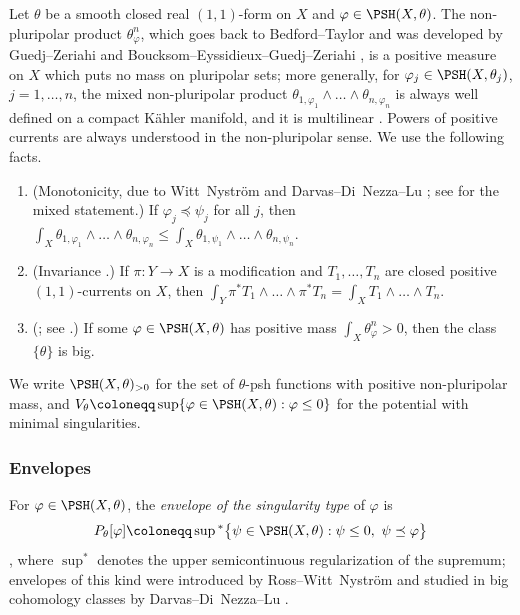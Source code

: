 Let $\theta$ be a smooth closed real $(1,1)$-form on $X$ and
$\varphi\in\PSH(X,\theta)$. The non-pluripolar product
$\theta_\varphi^n$, which goes back to Bedford--Taylor \cite{BT87} and
was developed by Guedj--Zeriahi \cite{GZ07} and
Boucksom--Eyssidieux--Guedj--Zeriahi
\cite{BEGZ10}, is a positive measure on $X$ which puts no mass on
pluripolar sets; more generally, for $\varphi_j\in\PSH(X,\theta_j)$,
$j=1,\dots,n$, the mixed non-pluripolar product
$\theta_{1,\varphi_1}\wedge\dots\wedge\theta_{n,\varphi_n}$ is always
well defined on a compact K\"ahler manifold, and it is multilinear
\cite[Proposition~2.2.1]{SGPT}. Powers of positive currents are always
understood in the non-pluripolar sense. We use the following facts.
\begin{enumerate}[label=(\alph*),leftmargin=*,itemsep=.2em,topsep=.3em]
\item\label{nk:it:monotone} (Monotonicity, due to Witt~Nystr\"om \cite{WN19}
  and Darvas--Di~Nezza--Lu \cite{DDNL18mono}; see
  \cite[Theorem~2.4.3]{SGPT} for the mixed statement.) If
  $\varphi_j\preceq\psi_j$ for all $j$, then
  $\int_X\theta_{1,\varphi_1}\wedge\dots\wedge\theta_{n,\varphi_n}
  \le\int_X\theta_{1,\psi_1}\wedge\dots\wedge\theta_{n,\psi_n}$.
\item\label{nk:it:invariance} (Invariance \cite[Proposition~2.4.2]{SGPT}.)
  If $\pi\colon Y\to X$ is a modification and $T_1,\dots,T_n$ are
  closed positive $(1,1)$-currents on $X$, then
  $\int_Y\pi^*T_1\wedge\dots\wedge\pi^*T_n=\int_XT_1\wedge\dots\wedge T_n$.
\item\label{nk:it:bigness} (\cite[Proposition~1.22]{BEGZ10}; see
  \cite[Proposition~2.4.1]{SGPT}.) If some $\varphi\in\PSH(X,\theta)$
  has positive mass $\int_X\theta_\varphi^n>0$, then the class
  $\{\theta\}$ is big.
\end{enumerate}
We write $\PSH(X,\theta)_{>0}$ for the set of $\theta$-psh functions with
positive non-pluripolar mass, and
$V_\theta\coloneqq \sup\{\varphi\in\PSH(X,\theta):\varphi\le0\}$ for the potential
with minimal singularities.

\subsubsection*{Envelopes}
For $\varphi\in\PSH(X,\theta)$, the \emph{envelope of the singularity
type} of $\varphi$ is
\[
  P_\theta[\varphi]
  \coloneqq \sup{}^*\bigl\{\psi\in\PSH(X,\theta):\psi\le0,\ \psi\preceq\varphi\bigr\}
\]
\cite[Definition~3.1.2]{SGPT}, where $\sup^*$ denotes the upper
semicontinuous regularization of the supremum; envelopes of this kind
were introduced by Ross--Witt~Nystr\"om \cite{RWN14} and studied in big
cohomology classes by Darvas--Di~Nezza--Lu
\cite{DDNL18full,DDNL18mono}.

